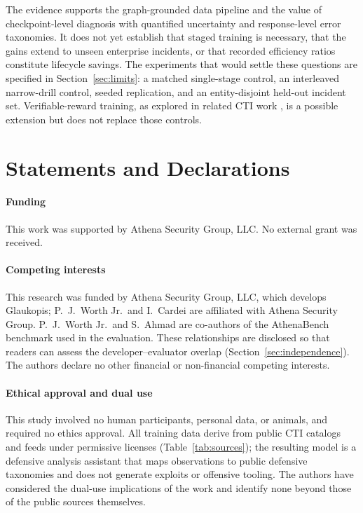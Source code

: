 \documentclass[twocolumn]{svjour3}
\begin{document}
The evidence supports the graph-grounded data pipeline and the value of checkpoint-level diagnosis with quantified uncertainty and response-level error taxonomies. It does not yet establish that staged training is necessary, that the gains extend to unseen enterprise incidents, or that recorded efficiency ratios constitute lifecycle savings. The experiments that would settle these questions are specified in Section~\ref{sec:limits}: a matched single-stage control, an interleaved narrow-drill control, seeded replication, and an entity-disjoint held-out incident set. Verifiable-reward training, as explored in related CTI work \cite{alam2026minerva}, is a possible extension but does not replace those controls.


\section*{Statements and Declarations}
\paragraph{Funding}
This work was supported by Athena Security Group, LLC. No external grant was received.

\paragraph{Competing interests}
This research was funded by Athena Security Group, LLC, which develops Glaukopis; P.~J.~Worth Jr.\ and I.~Cardei are affiliated with Athena Security Group. P.~J.~Worth Jr.\ and S.~Ahmad are co-authors of the AthenaBench benchmark used in the evaluation. These relationships are disclosed so that readers can assess the developer--evaluator overlap (Section~\ref{sec:independence}). The authors declare no other financial or non-financial competing interests.

\paragraph{Ethical approval and dual use}
This study involved no human participants, personal data, or animals, and required no ethics approval. All training data derive from public CTI catalogs and feeds under permissive licenses (Table~\ref{tab:sources}); the resulting model is a defensive analysis assistant that maps observations to public defensive taxonomies and does not generate exploits or offensive tooling. The authors have considered the dual-use implications of the work and identify none beyond those of the public sources themselves.
\end{document}
